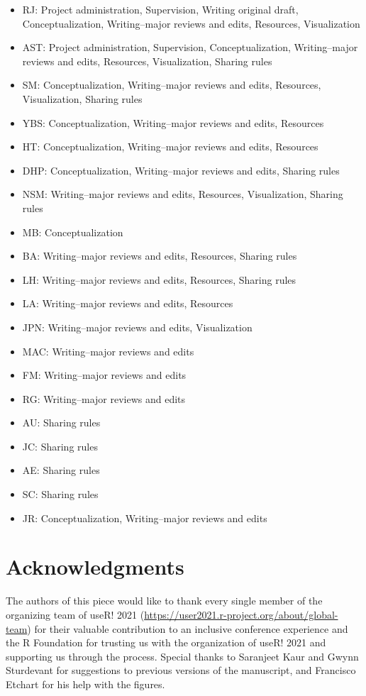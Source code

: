 \documentclass[10pt,letterpaper]{article}
\begin{document}
\begin{itemize}
    \item RJ: Project administration, Supervision, Writing original draft, Conceptualization, Writing--major reviews and edits, Resources, Visualization
    \item AST: Project administration, Supervision, Conceptualization,  Writing--major reviews and edits, Resources, Visualization, Sharing rules
    \item SM: Conceptualization, Writing--major reviews and edits, Resources, Visualization, Sharing rules
    \item YBS: Conceptualization, Writing--major reviews and edits, Resources
    \item HT: Conceptualization, Writing--major reviews and edits, Resources
    \item DHP: Conceptualization, Writing--major reviews and edits, Sharing rules
    \item NSM: Writing--major reviews and edits, Resources, Visualization, Sharing rules
    \item MB: Conceptualization
    \item BA: Writing--major reviews and edits, Resources, Sharing rules
    \item LH: Writing--major reviews and edits, Resources, Sharing rules
    \item LA: Writing--major reviews and edits, Resources
    \item JPN: Writing--major reviews and edits, Visualization
    \item MAC: Writing--major reviews and edits
    \item FM: Writing--major reviews and edits
    \item RG: Writing--major reviews and edits
    \item AU: Sharing rules
    \item JC: Sharing rules
    \item AE: Sharing rules
    \item SC: Sharing rules
    \item JR: Conceptualization, Writing--major reviews and edits
\end{itemize}



\section*{Acknowledgments}
The authors of this piece would like to thank every single member of the organizing team of useR! 2021 (\url{https://user2021.r-project.org/about/global-team}) for their valuable contribution to an inclusive conference experience and the R Foundation for trusting us with the organization of useR! 2021 and supporting us through the process. Special thanks to Saranjeet Kaur and Gwynn Sturdevant for suggestions to previous versions of the manuscript, and Francisco Etchart for his help with the figures.
\end{document}
